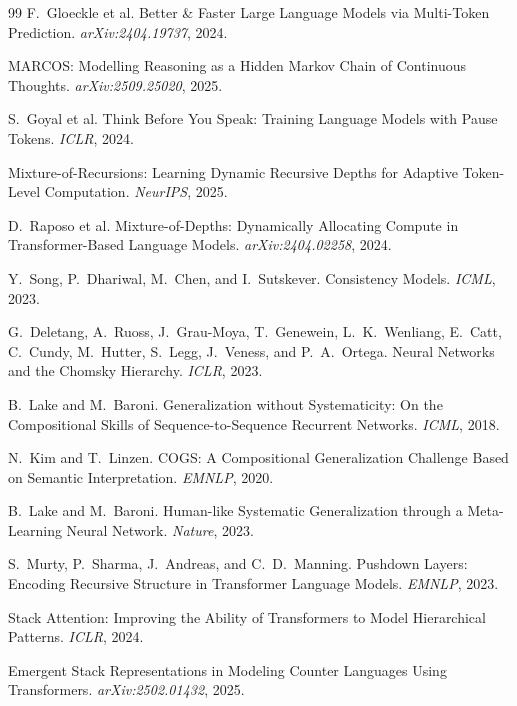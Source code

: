 \documentclass[11pt, a4paper]{article}
\theoremstyle{plain}
\theoremstyle{definition}
\theoremstyle{remark}
\begin{document}
\begin{thebibliography}{99}
F.~Gloeckle et al.
\newblock Better \& Faster Large Language Models via Multi-Token Prediction.
\newblock \emph{arXiv:2404.19737}, 2024.

MARCOS: Modelling Reasoning as a Hidden Markov Chain of Continuous Thoughts.
\newblock \emph{arXiv:2509.25020}, 2025.

S.~Goyal et al.
\newblock Think Before You Speak: Training Language Models with Pause Tokens.
\newblock \emph{ICLR}, 2024.

Mixture-of-Recursions: Learning Dynamic Recursive Depths for Adaptive Token-Level Computation.
\newblock \emph{NeurIPS}, 2025.

D.~Raposo et al.
\newblock Mixture-of-Depths: Dynamically Allocating Compute in Transformer-Based Language Models.
\newblock \emph{arXiv:2404.02258}, 2024.

Y.~Song, P.~Dhariwal, M.~Chen, and I.~Sutskever.
\newblock Consistency Models.
\newblock \emph{ICML}, 2023.

G.~Deletang, A.~Ruoss, J.~Grau-Moya, T.~Genewein, L.~K.~Wenliang, E.~Catt, C.~Cundy, M.~Hutter, S.~Legg, J.~Veness, and P.~A.~Ortega.
\newblock Neural Networks and the Chomsky Hierarchy.
\newblock \emph{ICLR}, 2023.

B.~Lake and M.~Baroni.
\newblock Generalization without Systematicity: On the Compositional Skills of Sequence-to-Sequence Recurrent Networks.
\newblock \emph{ICML}, 2018.

N.~Kim and T.~Linzen.
\newblock COGS: A Compositional Generalization Challenge Based on Semantic Interpretation.
\newblock \emph{EMNLP}, 2020.

B.~Lake and M.~Baroni.
\newblock Human-like Systematic Generalization through a Meta-Learning Neural Network.
\newblock \emph{Nature}, 2023.

S.~Murty, P.~Sharma, J.~Andreas, and C.~D.~Manning.
\newblock Pushdown Layers: Encoding Recursive Structure in Transformer Language Models.
\newblock \emph{EMNLP}, 2023.

Stack Attention: Improving the Ability of Transformers to Model Hierarchical Patterns.
\newblock \emph{ICLR}, 2024.

Emergent Stack Representations in Modeling Counter Languages Using Transformers.
\newblock \emph{arXiv:2502.01432}, 2025.


\end{thebibliography}
\end{document}
